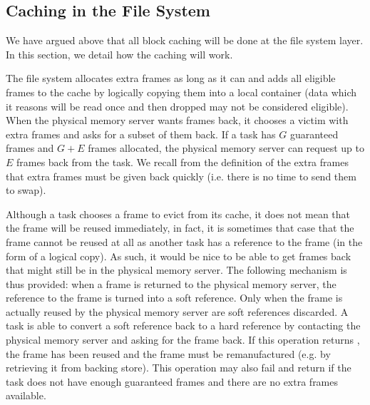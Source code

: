 \subsection{Caching in the File System}

We have argued above that all block caching will be done at the file
system layer.  In this section, we detail how the caching will work.

The file system allocates extra frames as long as it can and adds all
eligible frames to the cache by logically copying them into a local
container (data which it reasons will be read once and then dropped
may not be considered eligible).  When the physical memory server
wants frames back, it chooses a victim with extra frames and asks for a
subset of them back.  If a task has $G$ guaranteed frames and $G + E$
frames allocated, the physical memory server can request up to $E$
frames back from the task.  We recall from the definition of the extra
frames that extra frames must be given back quickly (i.e. there is no
time to send them to swap).

Although a task chooses a frame to evict from its cache, it does not
mean that the frame will be reused immediately, in fact, it is
sometimes that case that the frame cannot be reused at all as another
task has a reference to the frame (in the form of a logical copy).  As
such, it would be nice to be able to get frames back that might still
be in the physical memory server.  The following mechanism is thus
provided: when a frame is returned to the physical memory server, the
reference to the frame is turned into a soft reference.  Only when the
frame is actually reused by the physical memory server are soft
references discarded.  A task is able to convert a soft reference back
to a hard reference by contacting the physical memory server and
asking for the frame back.  If this operation returns
, the frame has been reused and the frame must be
remanufactured (e.g. by retrieving it from backing store).  This
operation may also fail and return  if the task does not
have enough guaranteed frames and there are no extra frames available.

\begin{comment}
There is a problem here in the form of name space pollution: the task
doing the caching has to remember the mapping of blocks to container
identifiers in order to recover the soft reference but the task has no
way to know when the physical memory server expires a given soft
reference.  Thus, while the physical memory server may drop a frame,
the task will only ever know this when it tries to convert the soft
reference to a hard reference and fails (i.e. gets a cache miss).  For
frames which this is never done, the memorized mapping will never be
invalidated.  This may not be a problem if a block offset to container
id is used, however, if hashing is done or some other mapping of block
offsets to container identifiers is used, this will pollute the cache
container's name space.
\end{comment}

